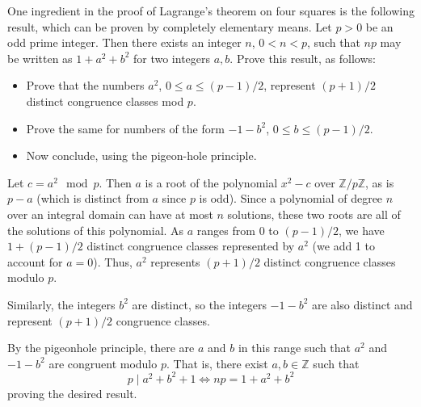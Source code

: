 \documentclass[../../master.tex]{subfiles}
\begin{document}
\begin{problem}
    One ingredient in the proof of Lagrange's theorem on four squares is the following result, which can be proven by completely elementary means.
    Let $p > 0$ be an odd prime integer.
    Then there exists an integer $n$, $0 < n < p$, such that $np$ may be written as $1 + a^2 + b^2$ for two integers $a, b$.
    Prove this result, as follows:
    \begin{itemize}
        \item Prove that the numbers $a^2$, $0 \leq a \leq (p - 1)/2$, represent $(p + 1)/2$ distinct congruence classes mod $p$.
        \item Prove the same for numbers of the form $-1 - b^2$, $0 \leq b \leq (p-1)/2$.
        \item Now conclude, using the pigeon-hole principle.
    \end{itemize}
\end{problem}

\begin{solution}
    Let $c = a^2 \mod p$.
    Then $a$ is a root of the polynomial $x^2 - c$ over $\mathbb{Z}/p\mathbb{Z}$, as is $p - a$ (which is distinct from $a$ since $p$ is odd).
    Since a polynomial of degree $n$ over an integral domain can have at most $n$ solutions, these two roots are all of the solutions of this polynomial.
    As $a$ ranges from $0$ to $(p-1)/2$, we have $1 + (p-1)/2$ distinct congruence classes represented by $a^2$ (we add 1 to account for $a = 0$).
    Thus, $a^2$ represents $(p + 1)/2$ distinct congruence classes modulo $p$.

    Similarly, the integers $b^2$ are distinct, so the integers $-1 - b^2$ are also distinct and represent $(p + 1)/2$ congruence classes.

    By the pigeonhole principle, there are $a$ and $b$ in this range such that $a^2$ and $-1 - b^2$ are congruent modulo $p$.
    That is, there exist $a, b \in \mathbb{Z}$ such that
    \[
    p \mid a^2 + b^2 + 1 \Longleftrightarrow np = 1 + a^2 + b^2
    \]
    proving the desired result.
\end{solution}
\end{document}
